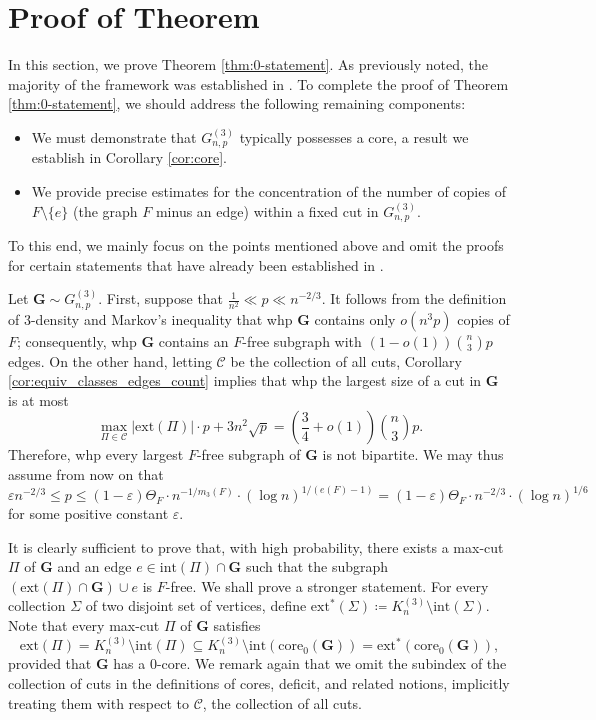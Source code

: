 \documentclass[11pt,a4paper,oneside,reqno]{amsart}
\newcommand{\Gnp}{G_{n, p}^{(3)}}
\newcommand{\bG}{\mathbf{G}}
\newcommand{\cC}{\mathcal{C}}
\newcommand{\1}{\mathbbm{1}} %
\newcommand{\eps}{\varepsilon}
\renewcommand{\le}{\leqslant}
\newcommand{\ext}{\mathrm{ext}}
\renewcommand{\int}{\mathrm{int}}
\newcommand{\core}{\mathrm{core}}
\begin{document}
\section{Proof of Theorem \normalfont{\ref{thm:0-statement}}}\label{section:0-statement}
In this section, we prove Theorem \ref{thm:0-statement}. As previously noted, the majority of the framework was established in \cite{hoshen2024stabilitylargecutsrandom}. To complete the proof of Theorem \ref{thm:0-statement}, we should address the following remaining components:
\begin{itemize}
    \item We must demonstrate that $\Gnp$ typically possesses a core, a result we establish in Corollary \ref{cor:core}.
    \item We provide precise estimates for the concentration of the number of copies of $F \setminus \{e\}$ (the graph $F$ minus an edge) within a fixed cut in $\Gnp$.
\end{itemize}
To this end, we mainly focus on the points mentioned above and omit the proofs for certain statements that have already been established in \cite{hoshen2024stabilitylargecutsrandom}.

Let $\bG \sim \Gnp$.
First, suppose that $\frac{1}{n^2} \ll p \ll n^{-2/3}$.
It follows from the definition of $3$-density and Markov's inequality that whp $\bG$ contains only $o(n^3 p)$ copies of $F$;
consequently, whp $\bG$ contains an $F$-free subgraph with $(1-o(1))\binom{n}{3}p$ edges.
On the other hand, letting $\cC$ be the collection of all cuts, Corollary \ref{cor:equiv_classes_edges_count} implies that whp the largest size of a cut in $\bG$ is at most
\[
  \max_{\Pi \in \cC} |\ext(\Pi)| \cdot p + 3n^2\sqrt{p} = \left(\frac{3}{4} + o(1)\right) \binom{n}{3}p.
\]
Therefore, whp every largest $F$-free subgraph of $\bG$ is not bipartite.
We may thus assume from now on that
\[
  \eps n^{-2/3} \le p \le (1-\eps) \Theta_F \cdot n^{-1/m_3(F)} \cdot (\log n)^{1/(e(F)-1)} = (1-\eps) \Theta_F \cdot n^{-2/3} \cdot (\log n)^{1/6}
\]
for some positive constant $\eps$.

It is clearly sufficient to prove that, with high probability, there exists a max-cut $\Pi$ of $\bG$ and an edge $e \in \int(\Pi) \cap \bG$ such that the subgraph $(\ext(\Pi) \cap \bG) \cup e$ is $F$-free.  We shall prove a stronger statement.
For every collection $\Sigma$ of two disjoint set of vertices, define $\ext^*(\Sigma) \coloneqq K_n^{(3)} \setminus \int(\Sigma)$. Note that every max-cut $\Pi$ of $\bG$ satisfies
\[
  \ext(\Pi) = K_n^{(3)} \setminus \int(\Pi) \subseteq K_n^{(3)} \setminus \int(\core_0(\bG)) = \ext^*(\core_0(\bG)),
\]
provided that $\bG$ has a $0$-core. We remark again that we omit the subindex of the collection of cuts in the definitions of cores, deficit, and related notions, implicitly treating them with respect to $\cC$, the collection of all cuts.
\end{document}
